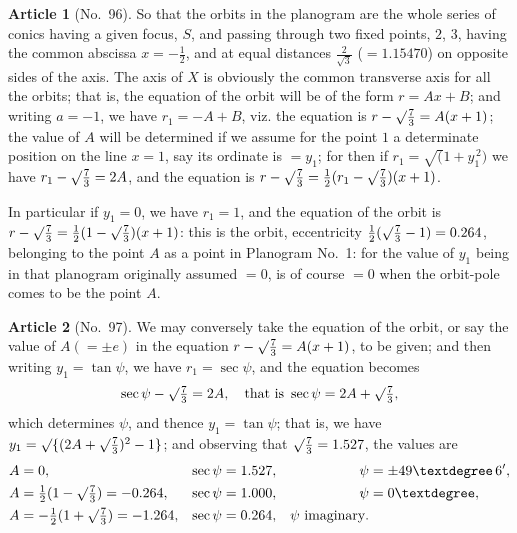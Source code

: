 \documentclass[11pt,a4paper]{article}
\theoremstyle{definition}
\newtheorem{art}{Article}
\begin{document}
\begin{art}[No.~96]
So that the orbits in the planogram are the whole series of conics having a given focus, $S$, and passing through two fixed points, $2$, $3$, having the common abscissa $x = -\frac{1}{2}$, and at equal distances $\frac{2}{\surd 3}$ ($= 1.15470$) on opposite sides of the axis. The axis of $X$ is obviously the common transverse axis for all the orbits; that is, the equation of the orbit will be of the form $r = Ax + B$; and writing $a = -1$, we have $r_1 = -A + B$, viz. the equation is $r - \surd\frac{7}{3} = A(x + 1)$; the value of $A$ will be determined if we assume for the point $1$ a determinate position on the line $x = 1$, say its ordinate is $= y_1$; for then if $r_1 = \surd(1 + y_1^{\,2})$ we have $r_1 - \surd\frac{7}{3} = 2A$, and the equation is $r - \surd\frac{7}{3} = \frac{1}{2}(r_1 - \surd\frac{7}{3})(x + 1)$.

In particular if $y_1 = 0$, we have $r_1 = 1$, and the equation of the orbit is $r - \surd\frac{7}{3} = \frac{1}{2}(1 - \surd\frac{7}{3})(x + 1)$: this is the orbit, eccentricity $\frac{1}{2}(\surd\frac{7}{3} - 1) = 0.264$, belonging to the point $A$ as a point in Planogram No.~1: for the value of $y_1$ being in that planogram originally assumed $= 0$, is of course $= 0$ when the orbit-pole comes to be the point $A$.
\end{art}

\begin{art}[No.~97]
We may conversely take the equation of the orbit, or say the value of $A (= \pm e)$ in the equation $r - \surd\frac{7}{3} = A(x + 1)$, to be given; and then writing $y_1 = \tan\psi$, we have $r_1 = \sec\psi$, and the equation becomes
\[
\sec\psi - \surd\tfrac{7}{3} = 2A, \quad \text{that is } \sec\psi = 2A + \surd\tfrac{7}{3},
\]
which determines $\psi$, and thence $y_1 = \tan\psi$; that is, we have $y_1 = \surd\{(2A + \surd\frac{7}{3})^2 - 1\}$; and observing that $\surd\frac{7}{3} = 1.527$, the values are
\begin{align*}
A &= 0, & \sec\psi &= 1.527, & \psi &= \pm 49°\, 6',\\
A &= \tfrac{1}{2}(1 - \surd\tfrac{7}{3}) = -0.264, & \sec\psi &= 1.000, & \psi &= 0°,\\
A &= -\tfrac{1}{2}(1 + \surd\tfrac{7}{3}) = -1.264, & \sec\psi &= 0.264, & \psi \text{ imaginary}.
\end{align*}
\end{art}
\end{document}
